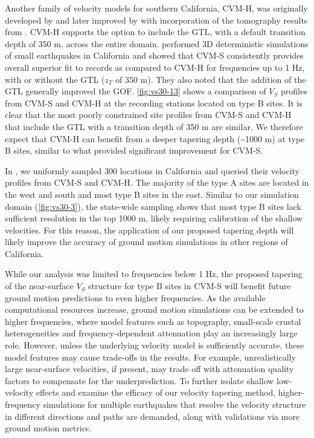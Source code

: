 Another family of velocity models for southern California, CVM-H, was originally developed by \citet{sussWaveSeismicVelocity2003} and later improved by \citet{pleschNewVelocityModel2007,pleschCVMHInversionIntegration2009,pleschUpdatesCVMHIncluding2017} with incorporation of the tomography results from \citet{tapeAdjointTomographySouthern2009, tapeSeismicTomographySouthern2010}. CVM-H supports the option to include the \citet{elyVs30derivedNearsurfaceSeismic2010} GTL, with a default transition depth of 350 m, across the entire domain. \citet{tabordaEvaluationSouthernCalifornia2016} performed 3D deterministic simulations of small earthquakes in California and showed that CVM-S consistently provides overall superior fit to records as compared to CVM-H for frequencies up to 1 Hz, with or without the \citet{elyVs30derivedNearsurfaceSeismic2010} GTL ($z_T$ of 350 m). They also noted that the addition of the \citet{elyVs30derivedNearsurfaceSeismic2010} GTL generally improved the GOF. \cref{fig:vs30-13} shows a comparison of $V_S$ profiles from CVM-S and CVM-H at the recording stations located on type B sites. It is clear that the most poorly constrained site profiles from CVM-S and CVM-H that include the \citet{elyVs30derivedNearsurfaceSeismic2010} GTL with a transition depth of 350 m are similar. We therefore expect that CVM-H can benefit from a deeper tapering depth (\textasciitilde 1000 m) at type B sites, similar to what provided significant improvement for CVM-S.

In , we uniformly sampled 300 locations in California and queried their velocity profiles from CVM-S and CVM-H. The majority of the type A sites are located in the west and south and most type B sites in the east. Similar to our simulation domain (\cref{fig:vs30-3}), the state-wide sampling shows that most type B sites lack sufficient resolution in the top 1000 m, likely requiring calibration of the shallow velocities. For this reason, the application of our proposed tapering depth will likely improve the accuracy of ground motion simulations in other regions of California.

While our analysis was limited to frequencies below 1 Hz, the proposed tapering of the near-surface $V_S$ structure for type B sites in CVM-S will benefit future ground motion predictions to even higher frequencies. As the available computational resources increase, ground motion simulations can be extended to higher frequencies, where model features such as topography, small-scale crustal heterogeneities and frequency-dependent attenuation play an increasingly large role. However, unless the underlying velocity model is sufficiently accurate, these model features may cause trade-offs in the results. For example, unrealistically large near-surface velocities, if present, may trade off with attenuation quality factors to compensate for the underprediction. To further isolate shallow low-velocity effects and examine the efficacy of our velocity tapering method, higher-frequency simulations for multiple earthquakes that resolve the velocity structure in different directions and paths are demanded, along with validations via more ground motion metrics.


